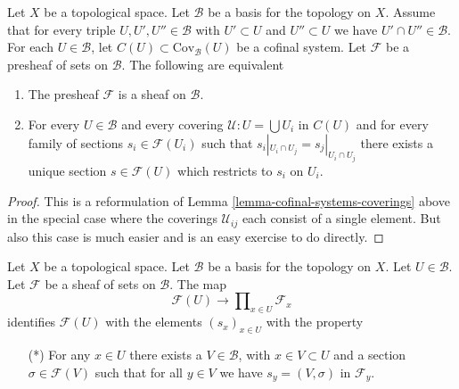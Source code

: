 \begin{lemma}
\label{lemma-cofinal-systems-coverings-standard-case}
Let $X$ be a topological space. Let $\mathcal{B}$ be a basis for the
topology on $X$. Assume that for every triple $U, U', U'' \in \mathcal{B}$
with $U' \subset U$ and $U'' \subset U$ we have $U' \cap U'' \in \mathcal{B}$.
For each $U \in \mathcal{B}$, let $C(U) \subset \text{Cov}_\mathcal{B}(U)$
be a cofinal system.
Let $\mathcal{F}$ be a presheaf of sets on $\mathcal{B}$.
The following are equivalent
\begin{enumerate}
\item The presheaf $\mathcal{F}$ is a sheaf on $\mathcal{B}$.
\item For every $U \in \mathcal{B}$ and every covering
$\mathcal{U} : U = \bigcup U_i$ in $C(U)$ and for every
family of sections $s_i \in \mathcal{F}(U_i)$ such
that $s_i|_{U_i \cap U_j} = s_j|_{U_i \cap U_j}$ there
exists a unique section $s \in \mathcal{F}(U)$ which
restricts to $s_i$ on $U_i$.
\end{enumerate}
\end{lemma}

\begin{proof}
This is a reformulation of
Lemma \ref{lemma-cofinal-systems-coverings} above
in the special case where the coverings $\mathcal{U}_{ij}$
each consist of a single element. But also this case is much
easier and is an easy exercise to do directly.
\end{proof}

\begin{lemma}
\label{lemma-condition-star-sections}
Let $X$ be a topological space.
Let $\mathcal{B}$ be a basis for the topology on $X$.
Let $U \in \mathcal{B}$.
Let $\mathcal{F}$ be a sheaf of sets on $\mathcal{B}$.
The map
$$
\mathcal{F}(U) \to \prod\nolimits_{x \in U} \mathcal{F}_x
$$
identifies $\mathcal{F}(U)$ with the elements $(s_x)_{x\in U}$
with the property
\begin{itemize}
\item[(*)] For any $x \in U$ there exists a $V \in \mathcal{B}$,
with $x \in V \subset U$ and a section $\sigma \in \mathcal{F}(V)$
such that for all $y \in V$ we have $s_y = (V, \sigma)$ in $\mathcal{F}_y$.
\end{itemize}
\end{lemma}


